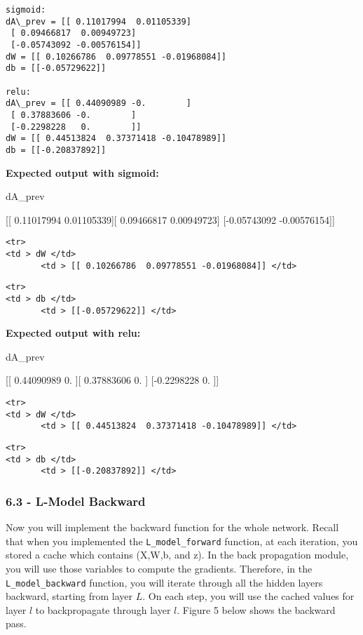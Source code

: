 \documentclass[11pt]{article}
\begin{document}
    \begin{Verbatim}[commandchars=\\\{\}]
sigmoid:
dA\_prev = [[ 0.11017994  0.01105339]
 [ 0.09466817  0.00949723]
 [-0.05743092 -0.00576154]]
dW = [[ 0.10266786  0.09778551 -0.01968084]]
db = [[-0.05729622]]

relu:
dA\_prev = [[ 0.44090989 -0.        ]
 [ 0.37883606 -0.        ]
 [-0.2298228   0.        ]]
dW = [[ 0.44513824  0.37371418 -0.10478989]]
db = [[-0.20837892]]

    \end{Verbatim}

    \textbf{Expected output with sigmoid:}

dA\_prev

{[}{[} 0.11017994 0.01105339{]}{[} 0.09466817 0.00949723{]}
{[}-0.05743092 -0.00576154{]}{]}

\begin{verbatim}
<tr>
<td > dW </td> 
       <td > [[ 0.10266786  0.09778551 -0.01968084]] </td> 
\end{verbatim}

\begin{verbatim}
<tr>
<td > db </td> 
       <td > [[-0.05729622]] </td> 
\end{verbatim}

    \textbf{Expected output with relu:}

dA\_prev

{[}{[} 0.44090989 0. {]}{[} 0.37883606 0. {]} {[}-0.2298228 0. {]}{]}

\begin{verbatim}
<tr>
<td > dW </td> 
       <td > [[ 0.44513824  0.37371418 -0.10478989]] </td> 
\end{verbatim}

\begin{verbatim}
<tr>
<td > db </td> 
       <td > [[-0.20837892]] </td> 
\end{verbatim}

    \subsubsection{6.3 - L-Model Backward}\label{l-model-backward}

Now you will implement the backward function for the whole network.
Recall that when you implemented the \texttt{L\_model\_forward}
function, at each iteration, you stored a cache which contains (X,W,b,
and z). In the back propagation module, you will use those variables to
compute the gradients. Therefore, in the \texttt{L\_model\_backward}
function, you will iterate through all the hidden layers backward,
starting from layer $L$. On each step, you will use the cached values
for layer $l$ to backpropagate through layer $l$. Figure 5 below shows
the backward pass.
\end{document}
